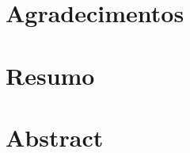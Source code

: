 \documentclass[11pt,a4paper]{report}
\begin{document}
\fancyfoot[C]{\thepage}

\begin{titlepage}
    
    
    
\end{titlepage}

\setcounter{page}{2}


\chapter*{Agradecimentos}






 \chapter*{Resumo}
 
%


 \chapter*{Abstract}
 
%


\renewcommand{\contentsname}{Índice}
\tableofcontents
\clearpage
\let\oldnumberline\numberline%
\renewcommand{\numberline}[1]{\hspace*{-1.5em}}%

\renewcommand*\listfigurename{Índice de Figuras}
\listoffigures
\clearpage

\renewcommand*{\listtablename}{Índice de Tabelas}
\listoftables
\clearpage

\printglossary[type=\acronymtype,nonumberlist, title={Acrónimos}]
\end{document}
